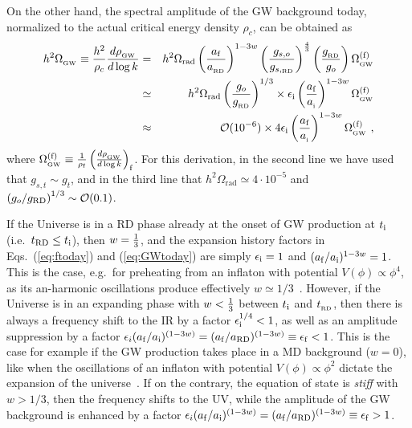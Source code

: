 \documentclass[a4paper,11pt]{article}
\newcommand{\GW}{{_{\rm GW}}}
\begin{document}
On the other hand, the spectral amplitude of the GW background today, normalized to the actual critical energy density $\rho_c$, can be obtained as
\begin{eqnarray}\label{eq:GWtoday}
h^{2}\Omega_{\GW} \equiv \frac{h^2}{\rho_c} \frac{d \rho_{_{\rm GW}}}{d \log k} &=& h^2\Omega_{\rm rad}\left(a_{{\rm f}}\over a_{_{\rm RD}}\right)^{1-3w}\left(g_{s,o}\over g_{s,_{\rm RD}}\right)^{4\over3}\left(g_{_{\rm RD}}\over g_{o}\right)\Omega_{_{\rm GW}}^{({\rm f})} \nonumber \\ 
&\simeq& h^{2}\Omega_{\mathrm{rad}}\left(\frac{g_{o}}{g_{_{\rm RD}}}\right)^{1/3}\times \epsilon_{\rm i}\left(a_{{\rm f}}\over a_{_{\rm i}}\right)^{1-3w}\Omega_{_{\rm GW}}^{({\rm f})} \nonumber \\
&\approx&  \mathcal{O}(10^{-6}) \times 4\epsilon_{\rm i}\left(a_{{\rm f}}\over a_{_{\rm i}}\right)^{1-3w}\Omega_{_{\rm GW}}^{({\rm f})} \ ,
\end{eqnarray}
where $\Omega_{_{\rm GW}}^{\rm (f)} \equiv {1\over\rho_{\rm f}}\left(d\rho_{\GW}\over d\log k\right)_{\rm f}$. For this derivation, in the second line we have used that $g_{s,t} \sim g_t$, and in the third line that  $h^{2}\Omega_{\mathrm{rad}} \simeq 4\cdot 10^{-5}$ and $\left(g_{o}/g_{\rm RD}\right)^{1/3}\sim\mathcal{O}(0.1)$.

If the Universe is in a RD phase already at the onset of GW production at $t_{\rm i}$ (i.e.~$t_{\rm RD} \leq t_{\rm i}$), then $w = {1\over3}$, and the expansion history factors in Eqs.~(\ref{eq:ftoday}) and (\ref{eq:GWtoday}) are simply $\epsilon_{\rm i} = 1$ and $ (a_{\rm f} / a_{\rm i} )^{1 - 3 w}= 1$.  This is the case, e.g.~for preheating from an inflaton with potential $V(\phi)\propto\phi^{4}$, as its an-harmonic oscillations produce effectively $w \simeq 1/3$~\cite{Turner:1983he}. However, if the Universe is in an expanding phase with $w < {1\over3}$ between $t_{\rm i}$ and $t_{_{\rm RD}}$, then there is always a frequency shift to the IR by a factor $\epsilon_{\rm i}^{1/4} < 1$, as well as an amplitude suppression by a factor $\epsilon_i(a_{{\rm f}}/a_{{\rm i}})^{(1 - 3 w)} = (a_{{\rm f }}/{a_{{\rm RD}}})^{(1 - 3 w)} \equiv \epsilon_{\rm f}  < 1$.  This is the case for example if the GW production takes place in a MD background ($w = 0$), like when the oscillations of an inflaton with potential $V(\phi)\propto\phi^{2}$ dictate the expansion of the universe~\cite{Turner:1983he}. If on the contrary, the equation of state is \textit{stiff} with $w > {1/3}$, then the frequency shifts to the UV, while the amplitude of the GW background is enhanced by a factor $\epsilon_i(a_{{\rm f}}/a_{{\rm i}})^{(1 - 3 w)} = (a_{{\rm f }}/{a_{{\rm RD}}})^{(1 - 3 w)} \equiv \epsilon_{\rm f} > 1$.
 
\end{document}
